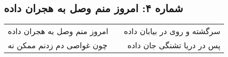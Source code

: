 \begin{center}
\section*{شماره ۴: امروز منم وصل به هجران داده}
\label{sec:004}
\begin{longtable}{l p{0.5cm} r}
امروز منم وصل به هجران داده
&&
سرگشته و روی در بیابان داده
\\
چون غواصی دم زدنم ممکن نه
&&
پس در دریا تشنگی جان داده
\\
\end{longtable}
\end{center}
